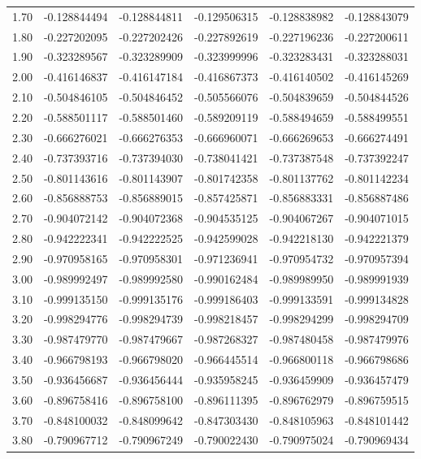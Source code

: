 \documentclass[11pt,a4paper]{article}
\begin{document}
\begin{longtable}{rrrrrr}
1.70 & -0.128844494 & -0.128844811 & -0.129506315 & -0.128838982 & -0.128843079 \\
1.80 & -0.227202095 & -0.227202426 & -0.227892619 & -0.227196236 & -0.227200611 \\
1.90 & -0.323289567 & -0.323289909 & -0.323999996 & -0.323283431 & -0.323288031 \\
2.00 & -0.416146837 & -0.416147184 & -0.416867373 & -0.416140502 & -0.416145269 \\
2.10 & -0.504846105 & -0.504846452 & -0.505566076 & -0.504839659 & -0.504844526 \\
2.20 & -0.588501117 & -0.588501460 & -0.589209119 & -0.588494659 & -0.588499551 \\
2.30 & -0.666276021 & -0.666276353 & -0.666960071 & -0.666269653 & -0.666274491 \\
2.40 & -0.737393716 & -0.737394030 & -0.738041421 & -0.737387548 & -0.737392247 \\
2.50 & -0.801143616 & -0.801143907 & -0.801742358 & -0.801137762 & -0.801142234 \\
2.60 & -0.856888753 & -0.856889015 & -0.857425871 & -0.856883331 & -0.856887486 \\
2.70 & -0.904072142 & -0.904072368 & -0.904535125 & -0.904067267 & -0.904071015 \\
2.80 & -0.942222341 & -0.942222525 & -0.942599028 & -0.942218130 & -0.942221379 \\
2.90 & -0.970958165 & -0.970958301 & -0.971236941 & -0.970954732 & -0.970957394 \\
3.00 & -0.989992497 & -0.989992580 & -0.990162484 & -0.989989950 & -0.989991939 \\
3.10 & -0.999135150 & -0.999135176 & -0.999186403 & -0.999133591 & -0.999134828 \\
3.20 & -0.998294776 & -0.998294739 & -0.998218457 & -0.998294299 & -0.998294709 \\
3.30 & -0.987479770 & -0.987479667 & -0.987268327 & -0.987480458 & -0.987479976 \\
3.40 & -0.966798193 & -0.966798020 & -0.966445514 & -0.966800118 & -0.966798686 \\
3.50 & -0.936456687 & -0.936456444 & -0.935958245 & -0.936459909 & -0.936457479 \\
3.60 & -0.896758416 & -0.896758100 & -0.896111395 & -0.896762979 & -0.896759515 \\
3.70 & -0.848100032 & -0.848099642 & -0.847303430 & -0.848105963 & -0.848101442 \\
3.80 & -0.790967712 & -0.790967249 & -0.790022430 & -0.790975024 & -0.790969434 \\

\end{longtable}
\end{document}
